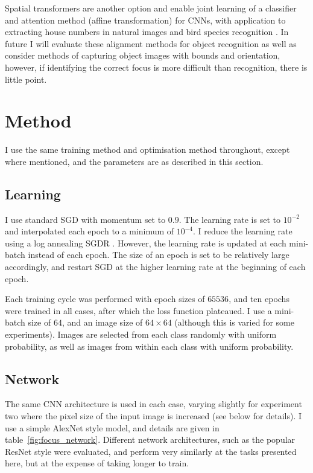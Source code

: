 Spatial transformers \cite{Jaderberg2015} are another option and enable joint learning of a classifier and attention method (affine transformation) for \gls{CNN}s, with application to extracting house numbers in natural images \cite{Netzer2011} and bird species recognition \cite{Wah2011}. In future I will evaluate these alignment methods for object recognition as well as consider methods of capturing object images with bounds and orientation, however, if identifying the correct focus is more difficult than recognition, there is little point.


\section{Method}

I use the same training method and optimisation method throughout, except where mentioned, and the parameters are as described in this section. 

\subsection {Learning}

I use standard \gls{SGD} with momentum set to $ 0.9 $. The learning rate is set to $ 10^{-2} $ and interpolated each epoch to a minimum of $ 10^{-4} $. I reduce the learning rate using a log annealing \gls{SGDR}  \cite{Loshchilov2016}. However, the learning rate is updated at each mini-batch instead of each epoch. The size of an epoch is set to be relatively large accordingly, and restart SGD at the higher learning rate at the beginning of each epoch. 

Each training cycle was performed with epoch sizes of $65536$, and ten epochs were trained in all cases, after which the loss function plateaued. I use a mini-batch size of $64$, and an image size of $64\times64$ (although this is varied for some experiments). Images are selected from each class randomly with uniform probability, as well as images from within each class with uniform probability.

\subsection {Network}

The same CNN architecture is used in each case, varying slightly for experiment two where the pixel size of the input image is increased (see below for details). I use a simple AlexNet \cite {Krizhevsky2012} style model, and details are given in table~\ref{fig:focus_network}. Different network architectures, such as the popular ResNet \cite{He2015} style were evaluated, and perform very similarly at the tasks presented here, but at the expense of taking longer to train.

